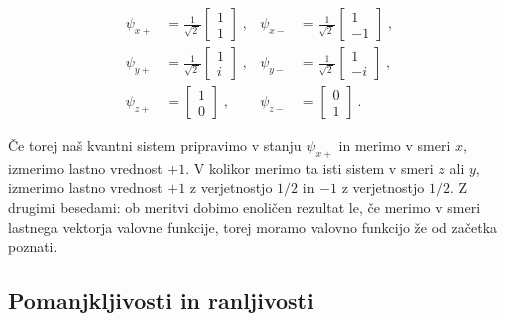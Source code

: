\documentclass[12pt]{article}
\begin{document}
\begin{equation}
\label{eigenvectors}
{\displaystyle {\begin{aligned}\psi _{x+}&={\frac {1}{\sqrt {2\,}}}{\begin{bmatrix}1\\1\end{bmatrix}}\;,&\psi _{x-}&={\frac {1}{\sqrt {2\,}}}{\begin{bmatrix}1\\-1\end{bmatrix}}\;,\\\psi _{y+}&={\frac {1}{\sqrt {2\,}}}{\begin{bmatrix}1\\i\end{bmatrix}}\;,&\psi _{y-}&={\frac {1}{\sqrt {2\,}}}{\begin{bmatrix}1\\-i\end{bmatrix}}\;,\\\psi _{z+}&={\begin{bmatrix}1\\0\end{bmatrix}}\;,&\psi _{z-}&={\begin{bmatrix}0\\1\end{bmatrix}}~.\end{aligned}}}
\end{equation}

\par Če torej naš kvantni sistem pripravimo v stanju $\psi_{x+}$ in merimo v smeri $x$, izmerimo lastno vrednost $+1$. V kolikor merimo ta isti sistem v smeri $z$ ali $y$, izmerimo lastno vrednost $+1$ z verjetnostjo $1/2$ in $-1$ z verjetnostjo $1/2$. Z drugimi besedami: ob meritvi dobimo enoličen rezultat le, če merimo v smeri lastnega vektorja valovne funkcije, torej moramo valovno funkcijo že od začetka poznati. 

\subsection{Pomanjkljivosti in ranljivosti}
\end{document}
